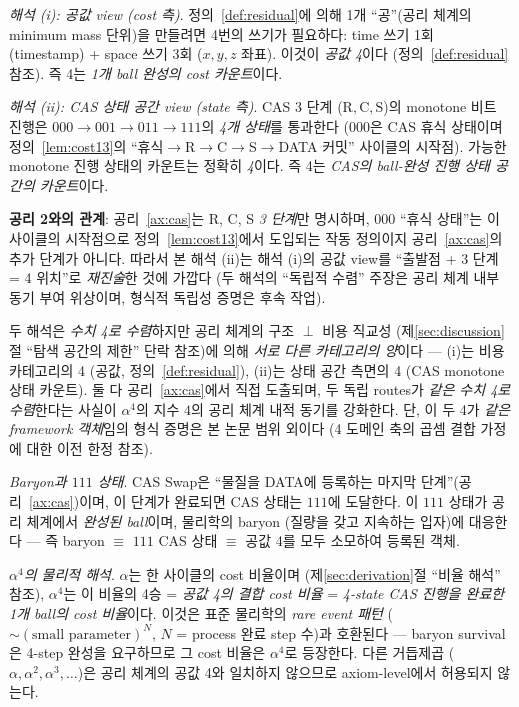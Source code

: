 \documentclass[entropy,article,submit,pdftex,oneauthor]{Definitions/mdpi}
\begin{document}
\emph{해석 (i): 공값 view (cost 측)}. 정의~\ref{def:residual}에 의해 1개 ``공''(공리 체계의 minimum mass 단위)을 만들려면 4번의 쓰기가 필요하다: time 쓰기 1회 (timestamp) + space 쓰기 3회 ($x, y, z$ 좌표). 이것이 \emph{공값 4}이다 (정의~\ref{def:residual} 참조). 즉 4는 \emph{1개 ball 완성의 cost 카운트}이다.

\emph{해석 (ii): CAS 상태 공간 view (state 측)}. CAS 3 단계 ($\mathrm{R}, \mathrm{C}, \mathrm{S}$)의 monotone 비트 진행은 $000 \to 001 \to 011 \to 111$의 \emph{4개 상태}를 통과한다 ($000$은 CAS 휴식 상태이며 정의~\ref{lem:cost13}의 ``휴식$\to$R$\to$C$\to$S$\to$DATA 커밋'' 사이클의 시작점). 가능한 monotone 진행 상태의 카운트는 정확히 \emph{4}이다. 즉 4는 \emph{CAS의 ball-완성 진행 상태 공간의 카운트}이다.

\textbf{공리 2와의 관계}: 공리~\ref{ax:cas}는 R, C, S \emph{3 단계}만 명시하며, $000$ ``휴식 상태''는 이 사이클의 시작점으로 정의~\ref{lem:cost13}에서 도입되는 작동 정의이지 공리~\ref{ax:cas}의 추가 단계가 아니다. 따라서 본 해석 (ii)는 해석 (i)의 공값 view를 ``출발점 + 3 단계 = 4 위치''로 \emph{재진술}한 것에 가깝다 (두 해석의 ``독립적 수렴'' 주장은 공리 체계 내부 동기 부여 위상이며, 형식적 독립성 증명은 후속 작업).

두 해석은 \emph{수치 4로 수렴}하지만 공리 체계의 구조 $\perp$ 비용 직교성 (제\ref{sec:discussion}절 ``탐색 공간의 제한'' 단락 참조)에 의해 \emph{서로 다른 카테고리의 양}이다 --- (i)는 비용 카테고리의 4 (공값, 정의~\ref{def:residual}), (ii)는 상태 공간 측면의 4 (CAS monotone 상태 카운트). 둘 다 공리~\ref{ax:cas}에서 직접 도출되며, 두 독립 routes가 \emph{같은 수치 4로 수렴}한다는 사실이 $\alpha^4$의 지수 $4$의 공리 체계 내적 동기를 강화한다. 단, 이 두 4가 \emph{같은 framework 객체}임의 형식 증명은 본 논문 범위 외이다 (4 도메인 축의 곱셈 결합 가정에 대한 이전 한정 참조).

\emph{Baryon과 $111$ 상태}. CAS Swap은 ``물질을 DATA에 등록하는 마지막 단계''(공리~\ref{ax:cas})이며, 이 단계가 완료되면 CAS 상태는 $111$에 도달한다. 이 $111$ 상태가 공리 체계에서 \emph{완성된 ball}이며, 물리학의 baryon (질량을 갖고 지속하는 입자)에 대응한다 --- 즉 baryon $\equiv$ $111$ CAS 상태 $\equiv$ 공값 4를 모두 소모하여 등록된 객체.

\emph{$\alpha^4$의 물리적 해석}. $\alpha$는 한 사이클의 cost 비율이며 (제\ref{sec:derivation}절 ``비율 해석'' 참조), $\alpha^4$는 이 비율의 4승 = \emph{공값 4의 결합 cost 비율} = \emph{4-state CAS 진행을 완료한 1개 ball의 cost 비율}이다. 이것은 표준 물리학의 \emph{rare event 패턴} ($\sim (\text{small parameter})^N$, $N$ = process 완료 step 수)과 호환된다 --- baryon survival은 4-step 완성을 요구하므로 그 cost 비율은 $\alpha^4$로 등장한다. 다른 거듭제곱 ($\alpha, \alpha^2, \alpha^3, \ldots$)은 공리 체계의 공값 4와 일치하지 않으므로 axiom-level에서 허용되지 않는다.
\end{document}
